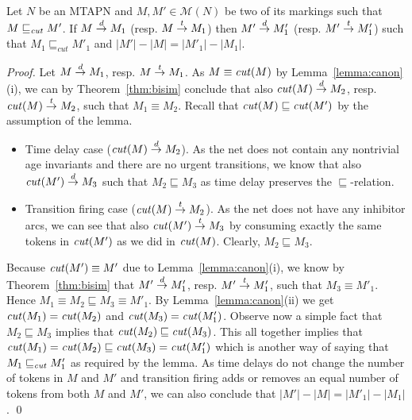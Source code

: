 \begin{lemma}
\label{lem:mono}
Let $N$ be an MTAPN and $M,M' \in \mathcal{M}(N)$
be two of its markings such that $M \sqsubseteq_{\mathit{cut}} M'$. 
If $M \stackrel{d}{\rightarrow} M_1$ (resp. $M \stackrel{t}{\rightarrow} M_1$) then 
$M' \stackrel{d}{\rightarrow} M'_1$ (resp. $M' \stackrel{t}{\rightarrow} M'_1$) such that 
$M_1 \sqsubseteq_{cut} M'_1$ and 
$|M'|-|M|=|M'_1|-|M_1|$.
\end{lemma}
\begin{proof}
Let $M \stackrel{d}{\rightarrow} M_1$, resp. $M \stackrel{t}{\rightarrow} M_1$.
As $M \equiv \mathit{cut}(M)$ by Lemma~\ref{lemma:canon}(i),
we can by Theorem~\ref{thm:bisim} conclude that also $\mathit{cut}(M) \stackrel{d}{\rightarrow} M_2$,
resp. $\mathit{cut}(M) \stackrel{t}{\rightarrow} M_2$,
such that $M_1 \equiv M_2$. Recall that $\mathit{cut}(M) \sqsubseteq \mathit{cut}(M')$
by the assumption of the lemma.
\begin{itemize}
\item Time delay case ($\mathit{cut}(M) \stackrel{d}{\rightarrow} M_2$).
As the net does not contain any nontrivial age invariants
and there are no urgent transitions,
we know that also $\mathit{cut}(M') \stackrel{d}{\rightarrow} M_3$ such that
$M_2 \sqsubseteq M_3$ as time delay preserves the $\sqsubseteq$-relation.
\item Transition firing case ($\mathit{cut}(M) \stackrel{t}{\rightarrow} M_2$).
As the net does not have any inhibitor arcs,
we can see that also $\mathit{cut}(M') \stackrel{t}{\rightarrow} M_3$ by consuming
exactly the same tokens in $\mathit{cut}(M')$ as we did in $\mathit{cut}(M)$.
Clearly, $M_2 \sqsubseteq M_3$.
\end{itemize}
Because $\mathit{cut}(M') \equiv M'$ due to Lemma~\ref{lemma:canon}(i),
we know by Theorem~\ref{thm:bisim}
that $M' \stackrel{d}{\rightarrow} M'_1$, resp. $M' \stackrel{t}{\rightarrow} M'_1$, such that $M_3 \equiv M'_1$.
Hence $M_1 \equiv M_2 \sqsubseteq M_3 \equiv M'_1$.
By Lemma~\ref{lemma:canon}(ii) we get
$\mathit{cut}(M_1)=\mathit{cut}(M_2)$ and $\mathit{cut}(M_3)=\mathit{cut}(M'_1)$.
Observe now a simple fact that $M_2 \sqsubseteq M_3$ implies that
$\mathit{cut}(M_2) \sqsubseteq \mathit{cut}(M_3)$.
This all together implies that $\mathit{cut}(M_1)=\mathit{cut}(M_2) \sqsubseteq
\mathit{cut}(M_3) = \mathit{cut}(M'_1)$ which is another way of saying that
$M_1 \sqsubseteq_{\mathit{cut}} M'_1$ as required by the lemma.
As time delays do not change the number of
tokens in $M$ and $M'$ and transition firing adds or removes an
equal number of tokens from both $M$ and $M'$,
we can also conclude that $|M'|-|M|=|M'_1|-|M_1|$.
\qed
\end{proof}





